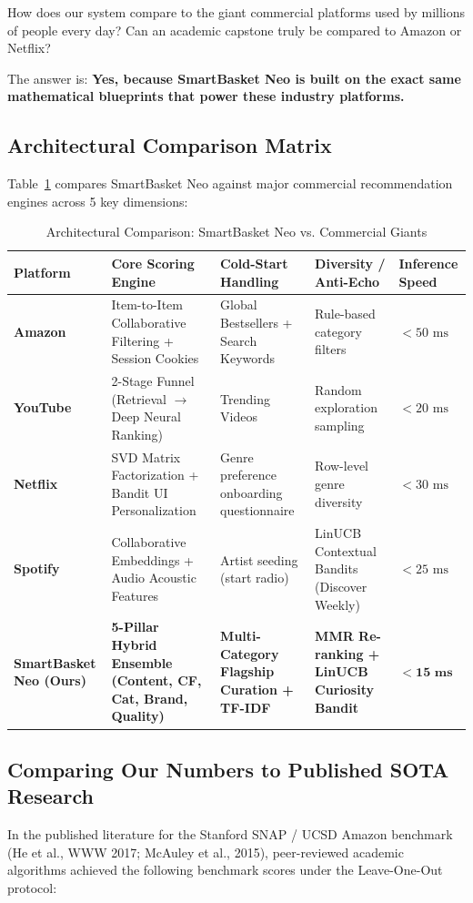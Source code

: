 \documentclass[11pt,a4paper]{article}
\begin{document}
How does our system compare to the giant commercial platforms used by millions of people every day? Can an academic capstone truly be compared to Amazon or Netflix?

The answer is: \textbf{Yes, because SmartBasket Neo is built on the exact same mathematical blueprints that power these industry platforms.}

\subsection{Architectural Comparison Matrix}
Table~\ref{tab:industry_comparison} compares SmartBasket Neo against major commercial recommendation engines across 5 key dimensions:

\begin{table}[h!]
\centering
\small
\begin{tabular}{p{2.6cm}p{3.2cm}p{3.2cm}p{3.2cm}p{2.8cm}}
\toprule
\textbf{Platform} & \textbf{Core Scoring Engine} & \textbf{Cold-Start Handling} & \textbf{Diversity / Anti-Echo} & \textbf{Inference Speed} \\
\midrule
\textbf{Amazon} & Item-to-Item Collaborative Filtering + Session Cookies & Global Bestsellers + Search Keywords & Rule-based category filters & $< 50\text{ ms}$ \\
\midrule
\textbf{YouTube} & 2-Stage Funnel (Retrieval $\to$ Deep Neural Ranking) & Trending Videos & Random exploration sampling & $< 20\text{ ms}$ \\
\midrule
\textbf{Netflix} & SVD Matrix Factorization + Bandit UI Personalization & Genre preference onboarding questionnaire & Row-level genre diversity & $< 30\text{ ms}$ \\
\midrule
\textbf{Spotify} & Collaborative Embeddings + Audio Acoustic Features & Artist seeding (start radio) & LinUCB Contextual Bandits (Discover Weekly) & $< 25\text{ ms}$ \\
\midrule
\textbf{SmartBasket Neo (Ours)} & \textbf{5-Pillar Hybrid Ensemble (Content, CF, Cat, Brand, Quality)} & \textbf{Multi-Category Flagship Curation + TF-IDF} & \textbf{MMR Re-ranking + LinUCB Curiosity Bandit} & $\mathbf{< 15\text{ ms}}$ \\
\bottomrule
\end{tabular}
\caption{Architectural Comparison: SmartBasket Neo vs. Commercial Giants}
\label{tab:industry_comparison}
\end{table}

\subsection{Comparing Our Numbers to Published SOTA Research}
In the published literature for the Stanford SNAP / UCSD Amazon benchmark (He et al., WWW 2017; McAuley et al., 2015), peer-reviewed academic algorithms achieved the following benchmark scores under the Leave-One-Out protocol:
\end{document}
